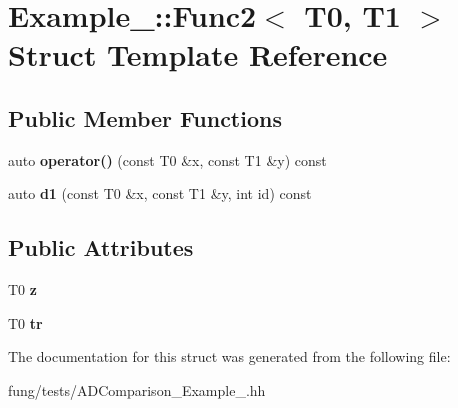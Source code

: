 \hypertarget{structExample__4_1_1Func2}{\section{Example\-\_\-:\-:Func2$<$ T0, T1 $>$ Struct Template Reference}
\label{structExample__4_1_1Func2}
}
\subsection*{Public Member Functions}
\begin{DoxyCompactItemize}
\item 
\hypertarget{structExample__4_1_1Func2_a17dd0685f87ee5d7144b6299818511b3}{auto {\bfseries operator()} (const T0 \&x, const T1 \&y) const }\label{structExample__4_1_1Func2_a17dd0685f87ee5d7144b6299818511b3}

\item 
\hypertarget{structExample__4_1_1Func2_a3211b4c10c2d235339245143f742f844}{auto {\bfseries d1} (const T0 \&x, const T1 \&y, int id) const }\label{structExample__4_1_1Func2_a3211b4c10c2d235339245143f742f844}

\end{DoxyCompactItemize}
\subsection*{Public Attributes}
\begin{DoxyCompactItemize}
\item 
\hypertarget{structExample__4_1_1Func2_ab69fbc6abf92d0f423bd2fa4ce8ef65f}{T0 {\bfseries z}}\label{structExample__4_1_1Func2_ab69fbc6abf92d0f423bd2fa4ce8ef65f}

\item 
\hypertarget{structExample__4_1_1Func2_a9ee94a34c8c83bd09496ad9f5be39b67}{T0 {\bfseries tr}}\label{structExample__4_1_1Func2_a9ee94a34c8c83bd09496ad9f5be39b67}

\end{DoxyCompactItemize}


The documentation for this struct was generated from the following file\-:\begin{DoxyCompactItemize}
\item 
fung/tests/A\-D\-Comparison\-\_\-\-Example\-\_.\-hh\end{DoxyCompactItemize}
